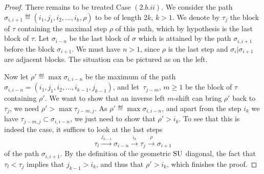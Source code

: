 \begin{proof}
There remains to be treated Case $(2.b.ii)$.
We consider the path $\sigma_{i,i+1} \eqdef (i_1,j_1,i_2,\dots,i_{k},\rho)$ to be of length $2k$, $k>1$. 
We denote by $\tau_j$ the block of $\tau$ containing the maximal step $\rho$ of this path, which by hypothesis is the last block of $\tau$. 
Let $\sigma_{i-n}$ be the last block of $\sigma$ which is attained by the path $\sigma_{i,i+1}$ before the block $\sigma_{i+1}$. 
We must have $n>1$, since $\rho$ is the last step and $\sigma_i|\sigma_{i+1}$ are adjacent blocks.
The situation can be pictured as on the left.
\begin{center}
\end{center}
Now let $\rho' \eqdef \max\sigma_{i,i-n}$ be the maximum of the path $\sigma_{i,i-n}=(i_1,j_1,i_2,\dots,i_{k-1},j_{k-1})$, and let~$\tau_{j-m}$, $m\geq 1$ be the block of $\tau$ containing $\rho'$.
We want to show that an inverse left $m$-shift can bring $\rho'$ back to $\tau_j$, \ie we need $\rho' > \max \tau_{j-m,j}$.
As $\rho'\eqdef \max \sigma_{i,i-n}$, and apart from the step $i_k$ we have $\tau_{j-m,j}\subset \sigma_{i,i-n}$, we just need to show that $\rho' > i_k$.
To see that this is indeed the case, it suffices to look at the last steps $$\tau_l \overset{j_{k-1}}{\longrightarrow} \sigma_{i-n} \overset{i_{k}}{\longrightarrow} \tau_j \overset{\rho}{\longrightarrow} \sigma_{i+1}$$ of the path $\sigma_{i,i+1}$. 
By the definition of the geometric $\mathrm{SU}$ diagonal, the fact that $\tau_l < \tau_j$ implies that $j_{k-1} > i_k$, and thus that $\rho' > i_k$, which finishes the proof. 
\end{proof}

